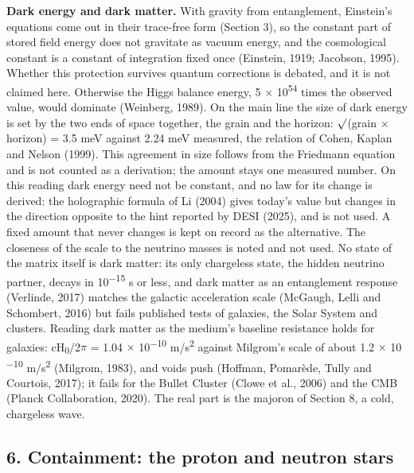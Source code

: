 \documentclass[
  11pt,
]{article}
\begin{document}
\textbf{Dark energy and dark matter.} With gravity from entanglement, Einstein's equations come out in their trace-free form (Section 3), so the constant part of stored field energy does not gravitate as vacuum energy, and the cosmological constant is a constant of integration fixed once (Einstein, 1919; Jacobson, 1995). Whether this protection survives quantum corrections is debated, and it is not claimed here. Otherwise the Higgs balance energy, 5 \ensuremath{\times} 10\textsuperscript{54} times the observed value, would dominate (Weinberg, 1989). On the main line the size of dark energy is set by the two ends of space together, the grain and the horizon: \ensuremath{\surd}(grain \ensuremath{\times} horizon) = 3.5 meV against 2.24 meV measured, the relation of Cohen, Kaplan and Nelson (1999). This agreement in size follows from the Friedmann equation and is not counted as a derivation; the amount stays one measured number. On this reading dark energy need not be constant, and no law for its change is derived: the holographic formula of Li (2004) gives today's value but changes in the direction opposite to the hint reported by DESI (2025), and is not used. A fixed amount that never changes is kept on record as the alternative. The closeness of the scale to the neutrino masses is noted and not used. No state of the matrix itself is dark matter: its only chargeless state, the hidden neutrino partner, decays in 10\textsuperscript{\ensuremath{-}15} s or less, and dark matter as an entanglement response (Verlinde, 2017) matches the galactic acceleration scale (McGaugh, Lelli and Schombert, 2016) but fails published tests of galaxies, the Solar System and clusters. Reading dark matter as the medium's baseline resistance holds for galaxies: cH\textsubscript{0}/2\ensuremath{\pi} = 1.04 \ensuremath{\times} 10\textsuperscript{\ensuremath{-}10} m/s\textsuperscript{2} against Milgrom's scale of about 1.2 \ensuremath{\times} 10\textsuperscript{\ensuremath{-}10} m/s\textsuperscript{2} (Milgrom, 1983), and voids push (Hoffman, Pomarède, Tully and Courtois, 2017); it fails for the Bullet Cluster (Clowe et al., 2006) and the CMB (Planck Collaboration, 2020). The real part is the majoron of Section 8, a cold, chargeless wave.

\hypertarget{containment-the-proton-and-neutron-stars}{%
\subsection{6. Containment: the proton and neutron stars}\label{containment-the-proton-and-neutron-stars}}
\end{document}
